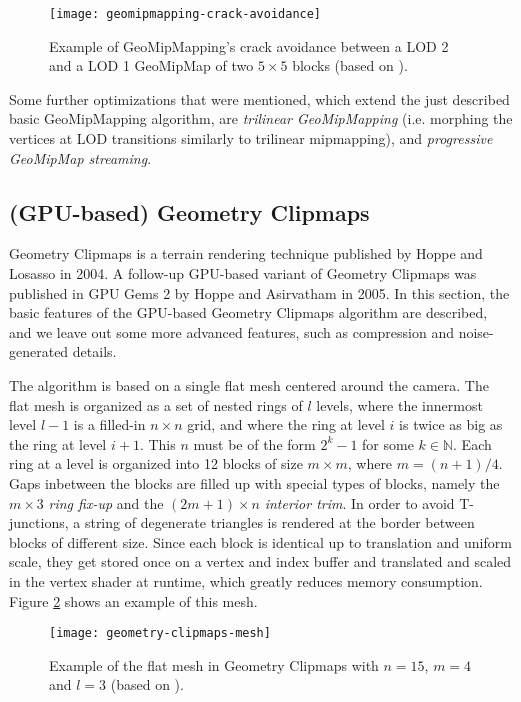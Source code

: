 \begin{figure}[H]
  \centering
  \texttt{[image: geomipmapping-crack-avoidance]}
  \caption{Example of GeoMipMapping's crack avoidance between a LOD 2 and a LOD 1 GeoMipMap of two $5 \times 5$ blocks (based on \cite{geomipmapping}).}\label{fig:geomipmapping-crack-avoidance}
\end{figure}

Some further optimizations that were mentioned, which extend the just described basic GeoMipMapping algorithm, 
are \textit{trilinear GeoMipMapping} (i.e. morphing the vertices at LOD transitions similarly to trilinear mipmapping),
and \textit{progressive GeoMipMap streaming}.

\subsection{(GPU-based) Geometry Clipmaps}
Geometry Clipmaps \cite{geomclipmaps} is a terrain rendering technique published by Hoppe and Losasso in 2004.
A follow-up GPU-based variant of Geometry Clipmaps \cite{gpugeomclipmaps} was published in GPU Gems 2 by Hoppe and Asirvatham in 2005.
In this section, the basic features of the GPU-based Geometry Clipmaps algorithm are described,
and we leave out some more advanced features, such as compression and noise-generated details.

The algorithm is based on a single flat mesh centered around the camera.
The flat mesh is organized as a set of nested rings of $l$ levels, 
where the innermost level $l-1$ is a filled-in $n \times n$ grid, and where the ring at level $i$ is twice as big as the ring 
at level $i + 1$. This $n$ must be of the form $2^k - 1$ for some $k \in \mathbb{N}$. 
Each ring at a level is organized into 12 blocks of size $m \times m$, where $m = (n+1)/4$.
Gaps inbetween the blocks are filled up with special types of blocks, namely the $m \times 3$ \textit{ring fix-up} and the $(2m+1) \times n$ \textit{interior trim}.
In order to avoid T-junctions, a string of degenerate triangles is rendered at the border between blocks of 
different size. Since each block is identical up to translation and uniform scale, they get stored once on a vertex and index buffer 
and translated and scaled in the vertex shader at runtime, which greatly reduces memory consumption.
Figure \ref{fig:geometry-clipmaps-mesh} shows an example of this mesh. 

\begin{figure}[H]
  \centering
  \texttt{[image: geometry-clipmaps-mesh]}
  \caption{Example of the flat mesh in Geometry Clipmaps with $n = 15$, $m = 4$ and $l = 3$ (based on \cite{gpugeomclipmaps}).}\label{fig:geometry-clipmaps-mesh}
\end{figure}

